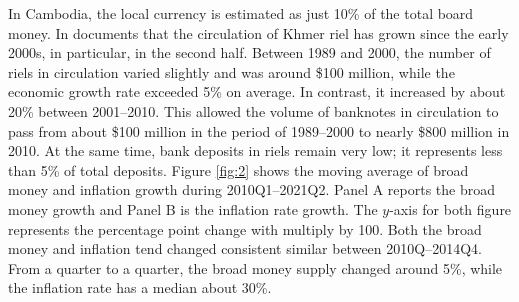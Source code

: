 \documentclass[11pt,letterpaper]{article}
\begin{document}
\begin{figure}[H]
\end{figure}

In Cambodia, the local currency is estimated as just 10\% of the total board money. In \citet{Khou2013} documents that the circulation of Khmer riel has grown since the early 2000s, in particular, in the second half. Between 1989 and 2000, the number of riels in circulation varied slightly and was around \$100 million, while the economic growth rate exceeded 5\% on average. In contrast, it increased by about 20\% between 2001--2010. This allowed the volume of banknotes in circulation to pass from about \$100 million in the period of 1989--2000 to nearly \$800 million in 2010. At the same time, bank deposits in riels remain very low; it represents less than 5\% of total deposits. Figure \ref{fig:2} shows the moving average of broad money and inflation growth during 2010Q1--2021Q2. Panel A reports the broad money growth and Panel B is the inflation rate growth. The $y$-axis for both figure represents the percentage point change with multiply by 100. Both the broad money and inflation tend changed consistent similar between 2010Q--2014Q4. From a quarter to a quarter, the broad money supply changed around 5\%, while the inflation rate has a median about 30\%. 
\end{document}
